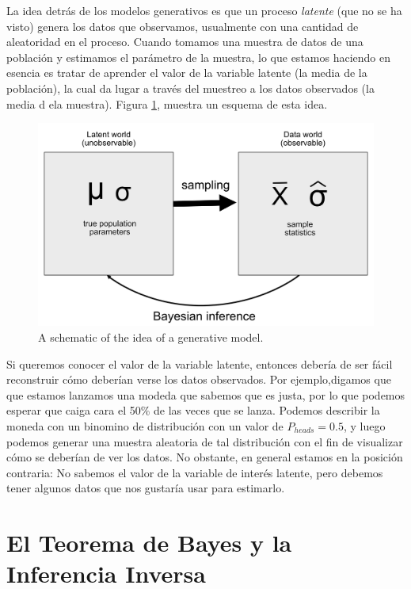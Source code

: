 \documentclass[
  12pt,
]{book}
\theoremstyle{definition}
\theoremstyle{definition}
\theoremstyle{definition}
\theoremstyle{remark}
\begin{document}
La idea detrás de los modelos generativos es que un proceso \emph{latente} (que no se ha visto) genera los datos que observamos, usualmente con una cantidad de aleatoridad en el proceso. Cuando tomamos una muestra de datos de una población y estimamos el parámetro de la muestra, lo que estamos haciendo en esencia es tratar de aprender el valor de la variable latente (la media de la población), la cual da lugar a través del muestreo a los datos observados (la media d ela muestra). Figura \ref{fig:GenerativeModel}, muestra un esquema de esta idea.

\begin{figure}
\includegraphics[width=0.8\linewidth]{images/BayesianInference} \caption{A schematic of the idea of a generative model.}\label{fig:GenerativeModel}
\end{figure}

Si queremos conocer el valor de la variable latente, entonces debería de ser fácil reconstruir cómo deberían verse los datos observados. Por ejemplo,digamos que que estamos lanzamos una modeda que sabemos que es justa, por lo que podemos esperar que caiga cara el 50\% de las veces que se lanza. Podemos describir la moneda con un binomino de distribución con un valor de \(P_{heads}=0.5\), y luego podemos generar una muestra aleatoria de tal distribución con el fin de visualizar cómo se deberían de ver los datos. No obstante, en general estamos en la posición contraria: No sabemos el valor de la variable de interés latente, pero debemos tener algunos datos que nos gustaría usar para estimarlo.

\hypertarget{el-teorema-de-bayes-y-la-inferencia-inversa}{%
\section{El Teorema de Bayes y la Inferencia Inversa}\label{el-teorema-de-bayes-y-la-inferencia-inversa}}
\end{document}
